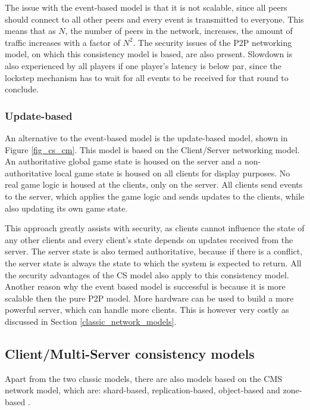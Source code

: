 \documentclass[10pt,a4paper,journal,cspaper,compsoc]{IEEEtran}
\begin{document}
The issue with the event-based model is that it is not scalable, since all peers should connect to all other peers and every event is transmitted to
everyone. This means that as $N$, the number of peers in the network, increases, the amount of traffic increases with a factor of $N^2$. The security
issues of the P2P networking model, on which this consistency model is based, are also present. Slowdown is also experienced by all players if one
player's latency is below par, since the lockstep mechanism has to wait for all events to be received for that round to conclude.

\subsubsection{Update-based}
An alternative to the event-based model is the update-based model, shown in Figure \ref{fig_cs_cm}. This model is based on the Client/Server
networking model. An authoritative global game state is housed on the server and a non-authoritative local game state is housed on all clients for
display purposes. No real game logic is housed at the clients, only on the server. All clients send events to the server, which applies the game
logic and sends updates to the clients, while also updating its own game state.

This approach greatly assists with security, as clients cannot influence the state of any other clients and every client's state depends on updates
received from the server. The server state is also termed authoritative, because if there is a conflict, the server state is always the state to
which the system is expected to return. All the security advantages of the \ac{CS} model also apply to this consistency model. Another reason why the
event based model is successful is because it is more scalable then the pure P2P model. More hardware can be used to build a more powerful server,
which can handle more clients. This is however very costly as discussed in Section \ref{classic_network_models}.

\subsection{Client/Multi-Server consistency models}
\label{cms_models}


Apart from the two classic models, there are also models based on the \ac{CMS} network model, which are: shard-based, replication-based, object-based
and zone-based \cite{Hu_voronoi_IM}.
\end{document}
